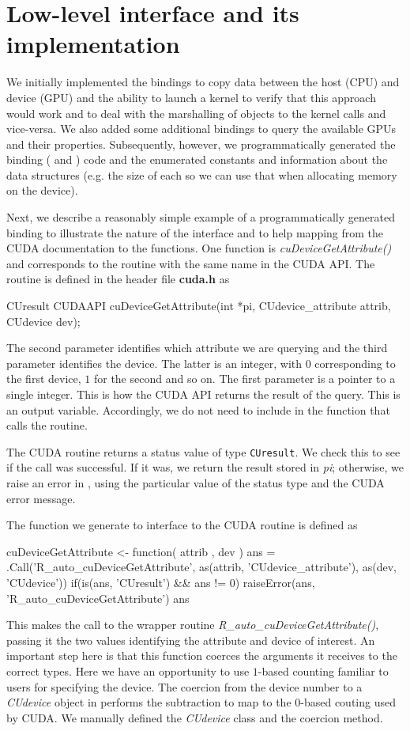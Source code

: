 \documentclass[article]{jss}
\def\C{\proglang{C}}
\def\R{\proglang{R}}
\def\Rfunc#1{\textsl{#1()}}
\def\Cfunc#1{\textit{#1()}}
\def\Cvar#1{\textit{#1}}
\def\file#1{\textbf{#1}}
\def\Ctype#1{\texttt{#1}}
\def\Rclass#1{\textit{#1}}
\begin{document}
\section{Low-level interface and its implementation}
We initially implemented the bindings to copy data between the host
(CPU) and device (GPU) and the ability to launch a kernel to verify
that this approach would work and to deal with the marshalling of \R{}
objects to the kernel calls and vice-versa.  We also added some
additional bindings to query the available GPUs and their properties.
Subsequently, however, we programmatically generated the binding (\R{}
and \C) code and the enumerated constants and information about the
data structures (e.g. the size of each so we can use that when
allocating memory on the device).  

Next, we describe a reasonably simple example of a programmatically
generated binding to illustrate the nature of the interface and to
help mapping  from the CUDA documentation to the \R{} functions.
One function is \Rfunc{cuDeviceGetAttribute} and corresponds to the routine
with the same name in the CUDA API.
The routine is defined  in the header file \file{cuda.h} as
\begin{Code}
CUresult CUDAAPI 
cuDeviceGetAttribute(int *pi, CUdevice_attribute attrib, CUdevice dev);
\end{Code}
The second parameter identifies which attribute we are querying and
the third parameter identifies the device. The latter is an integer,
with $0$ corresponding to the first device, $1$ for the second and so
on.  The first parameter is a pointer to a single integer. This is how
the CUDA API returns the result of the query.  This is an output
variable. Accordingly, we do not need to include in the \R{} function
that calls the \C{} routine.

The CUDA routine returns a status value of type \Ctype{CUresult}.  We
check this to see if the call was successful. If it was, we return the
result stored in \Cvar{pi}; otherwise, we raise an error in \R, using
the particular value of the status type and the CUDA error message.

The \R{} function we generate to interface to the CUDA routine is
defined as
\begin{RCode}
cuDeviceGetAttribute <-
function( attrib , dev  )
{
   ans = .Call('R_auto_cuDeviceGetAttribute', 
                   as(attrib, 'CUdevice_attribute'), 
                   as(dev, 'CUdevice'))
   if(is(ans, 'CUresult') && ans != 0)
       raiseError(ans, 'R_auto_cuDeviceGetAttribute')
   ans
}
\end{RCode}
This makes the call to the wrapper routine
\Cfunc{R\_auto\_cuDeviceGetAttribute}, passing it the two \R{} values
identifying the attribute and device of interest.  An important step
here is that this \R{} function coerces the arguments it receives to
the correct types.  Here we have an opportunity to use $1$-based
counting familiar to \R{} users for specifying the device.  The
coercion from the device number to a \Rclass{CUdevice} object in \R{}
performs the subtraction to map to the $0$-based couting used by CUDA.
We manually defined the \Rclass{CUdevice} class and the coercion method.
\end{document}
